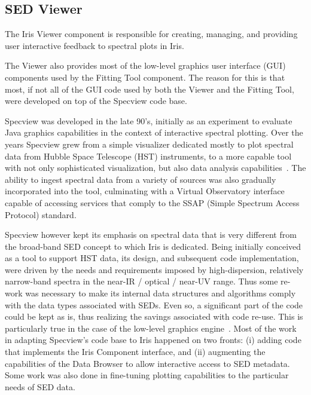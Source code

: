 \documentclass[5p]{elsarticle}
\begin{document}
\subsection{SED Viewer}
\label{subsec:specview}
The Iris Viewer component is responsible for creating, managing, and providing user interactive feedback to spectral plots in Iris. 

The Viewer also provides most of the low-level graphics user interface (GUI) components used by the Fitting Tool component. The reason for this is that most, if not all of the GUI code used by both the Viewer and the Fitting Tool, were developed on top of the Specview code base. 

Specview was developed in the late 90's, initially as an experiment to evaluate Java graphics capabilities in the context of interactive spectral plotting. Over the years Specview grew from a simple visualizer dedicated mostly to plot spectral data from Hubble Space Telescope (HST) instruments, to a more capable tool with not only sophisticated visualization, but also data analysis capabilities~\citep{2002ASPC..281..120B}. The ability to ingest spectral data from a variety of sources was also gradually incorporated into the tool, culminating with a Virtual Observatory interface capable of accessing services that comply to the SSAP (Simple Spectrum Access Protocol) standard.

Specview however kept its emphasis on spectral data that is very different from the broad-band SED concept to which Iris is dedicated. Being initially conceived as a tool to support HST data, its design, and subsequent code implementation, were driven by the needs and requirements imposed by high-dispersion, relatively narrow-band spectra in the near-IR / optical / near-UV range. Thus some re-work was necessary to make its internal data structures and algorithms comply with the data types associated with SEDs. Even so, a significant part of the code could be kept as is, thus realizing the savings associated with code re-use. This is particularly true in the case of the low-level graphics engine~\citep{2000ASPC..216...79B}. Most of the work in adapting Specview's code base to Iris happened on two fronts: (i) adding code that implements the Iris Component interface, and (ii) augmenting the capabilities of the Data Browser to allow interactive access to SED metadata. Some work was also done in fine-tuning plotting capabilities to the particular needs of SED data.
\end{document}
